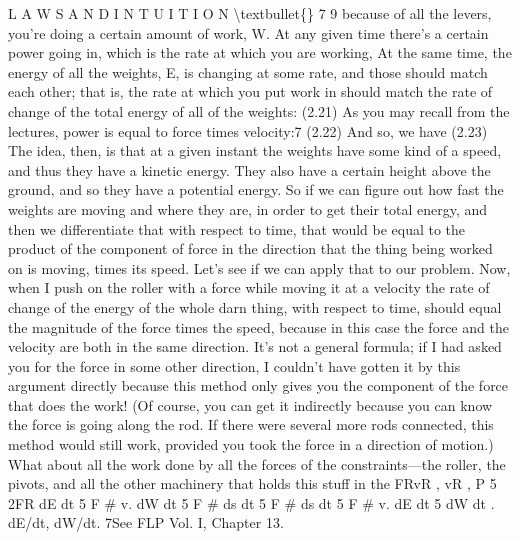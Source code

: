 \documentclass[10pt,oneside]{article}
\begin{document}
L A W S  A N D  I N T U I T I O N \textbackslash{}textbullet\{\} 7 9 because of all the levers, you’re doing a certain amount of work, W. At any given time there’s a certain power going in, which is the rate at which you are working, At the same time, the energy of all the weights, E, is changing at some rate, and those should match each other; that is, the rate at which you put work in should match the rate of change of the total energy of all of the weights: (2.21) As you may recall from the lectures, power is equal to force times velocity:7 (2.22) And so, we have (2.23) The idea, then, is that at a given instant the weights have some kind of a speed, and thus they have a kinetic energy. They also have a certain height above the ground, and so they have a potential energy. So if we can figure out how fast the weights are moving and where they are, in order to get their total energy, and then we differentiate that with respect to time, that would be equal to the product of the component of force in the direction that the thing being worked on is moving, times its speed. Let’s see if we can apply that to our problem. Now, when I push on the roller with a force while moving it at a velocity the rate of change of the energy of the whole darn thing, with respect to time, should equal the magnitude of the force times the speed, because in this case the force and the velocity are both in the same direction. It’s not a general formula; if I had asked you for the force in some other direction, I couldn’t have gotten it by this argument directly because this method only gives you the component of the force that does the work! (Of course, you can get it indirectly because you can know the force is going along the rod. If there were several more rods connected, this method would still work, provided you took the force in a direction of motion.) What about all the work done by all the forces of the constraints---the roller, the pivots, and all the other machinery that holds this stuff in the FRvR , vR , P 5 2FR dE dt 5 F \# v. dW dt 5 F \# ds dt 5 F \# ds dt 5 F \# v. dE dt 5 dW dt . dE/dt, dW/dt. 7See FLP Vol. I, Chapter 13.\par
\end{document}
